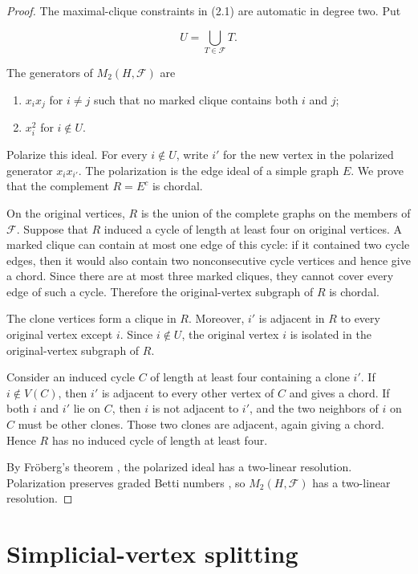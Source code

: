 \documentclass[11pt]{article}
\theoremstyle{definition}
\theoremstyle{remark}
\numberwithin{equation}{section}
\begin{document}
\begin{proof}

The maximal-clique constraints in (2.1) are automatic in degree two. Put

\nopagebreak[4]
\[
U=\bigcup_{T\in\mathcal F}T.
\]

The generators of $M_2(H,\mathcal F)$ are

\begin{enumerate}
\item $x_i x_j$ for $i\neq j$ such that no marked clique contains both $i$ and
   $j$;
\item $x_i^2$ for $i\notin U$.
\end{enumerate}

Polarize this ideal. For every $i\notin U$, write $i'$ for the new vertex in
the polarized generator $x_i x_{i'}$. The polarization is the edge ideal of a
simple graph $E$. We prove that the complement $R=E^c$ is chordal.

On the original vertices, $R$ is the union of the complete graphs on the
members of $\mathcal F$. Suppose that $R$ induced a cycle of length at least
four on original vertices. A marked clique can contain at most one edge of
this cycle: if it contained two cycle edges, then it would also contain two
nonconsecutive cycle vertices and hence give a chord. Since there are at most
three marked cliques, they cannot cover every edge of such a cycle. Therefore
the original-vertex subgraph of $R$ is chordal.

The clone vertices form a clique in $R$. Moreover, $i'$ is adjacent in $R$ to
every original vertex except $i$. Since $i\notin U$, the original vertex $i$
is isolated in the original-vertex subgraph of $R$.

Consider an induced cycle $C$ of length at least four containing a clone
$i'$. If $i\notin V(C)$, then $i'$ is adjacent to every other vertex of $C$
and gives a chord. If both $i$ and $i'$ lie on $C$, then $i$ is not adjacent
to $i'$, and the two neighbors of $i$ on $C$ must be other clones. Those two
clones are adjacent, again giving a chord. Hence $R$ has no induced cycle of
length at least four.

By Fröberg's theorem \cite{froberg1990}, the polarized ideal has a two-linear resolution.
Polarization preserves graded Betti numbers \cite[Section 1.6]{herzog2011}, so
$M_2(H,\mathcal F)$ has a two-linear resolution.
\end{proof}


\section{Simplicial-vertex splitting}
\end{document}

